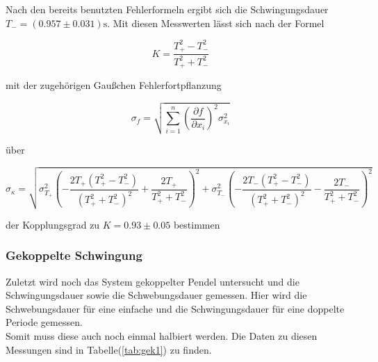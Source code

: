             \noindent Nach den bereits benutzten Fehlerformeln ergibt sich die Schwingungsdauer $T_- = (0.957 \pm 0.031) \si{\second}$.
            Mit diesen Messwerten lässt sich nach der Formel 

            \begin{equation*}
            K = \frac{T_{+}^2 - T_{-}^2}{T_{+}^2 + T_{-}^2} 
            \end{equation*}

            \noindent mit der zugehörigen Gaußchen Fehlerfortpflanzung
            
            \begin{equation}
            \sigma_f = \sqrt{\sum_{i=1}^{n} \left( \frac{\partial f}{\partial x_i} \right)^2 \sigma_{x_i}^2}
            \label{eqn:gauss}
            \end{equation}
            
            \noindent über

            \begin{equation*}
                \sigma_{\kappa} = \sqrt{\sigma_{T_{+}}^{2} \left(- \frac{2 T_{+} \left(T_{+}^{2} - T_{-}^{2}\right)}{\left(T_{+}^{2}
                 + T_{-}^{2}\right)^{2}} + \frac{2 T_{+}}{T_{+}^{2} + T_{-}^{2}}\right)^{2} + \sigma_{T_{-}}^{2} \left(- \frac{2 T_{-}
                  \left(T_{+}^{2} - T_{-}^{2}\right)}{\left(T_{+}^{2} + T_{-}^{2}\right)^{2}} - \frac{2 T_{-}}{T_{+}^{2} + T_{-}^{2}}\right)^{2}}
            \end{equation*}

            \noindent der Kopplungsgrad zu $K = 0.93 \pm 0.05$ bestimmen

        \subsubsection{Gekoppelte Schwingung}

            \noindent Zuletzt wird noch das System gekoppelter Pendel untersucht und die Schwingungsdauer sowie die Schwebungsdauer gemessen. 
            Hier wird die Schwebungsdauer für eine einfache und die Schwingungsdauer für eine doppelte Periode gemessen.\\
            Somit muss diese auch noch einmal halbiert werden. 
            Die Daten zu diesen Messungen sind in Tabelle(\ref{tab:gek1}) zu finden.


